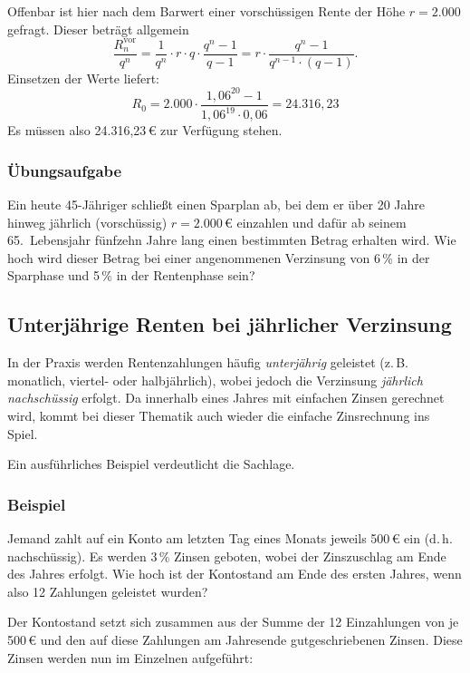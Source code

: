 Offenbar ist hier nach dem Barwert einer vorschüssigen Rente der Höhe $r = 2.000$ gefragt. Dieser beträgt allgemein
\[ \frac{R_n^{\text{vor}}}{q^n} = \frac{1}{q^n} \cdot r \cdot q \cdot \frac{q^n - 1}{q - 1} = r \cdot \frac{q^n - 1}{q^{n-1} \cdot (q - 1)} . \]
Einsetzen der Werte liefert:
\[ R_0 = 2.000 \cdot \frac{1{,}06^{20} - 1}{1{,}06^{19} \cdot 0{,}06} = 24.316{,}23 \]
Es müssen also 24.316{,}23\,€ zur Verfügung stehen.\beispielende

\subsubsection{Übungsaufgabe}

\begin{graukasten}
  Ein heute 45-Jähriger schließt einen Sparplan ab, bei dem er über 20 Jahre hinweg jährlich (vorschüssig) $r = 2.000\,€$ einzahlen und dafür ab seinem 65.~Lebensjahr fünfzehn Jahre lang einen bestimmten Betrag erhalten wird. Wie hoch wird dieser Betrag bei einer angenommenen Verzinsung von 6\,\% in der Sparphase und 5\,\% in der Rentenphase sein?
\end{graukasten}

\subsection{Unterjährige Renten bei jährlicher Verzinsung}

In der Praxis werden Rentenzahlungen häufig \emph{unterjährig} geleistet (z.\,B. monatlich, viertel- oder halbjährlich), wobei jedoch die Verzinsung \emph{jährlich nachschüssig} erfolgt. Da innerhalb eines Jahres mit einfachen Zinsen gerechnet wird, kommt bei dieser Thematik auch wieder die einfache Zinsrechnung ins Spiel.

Ein ausführliches Beispiel verdeutlicht die Sachlage.

\subsubsection{Beispiel}

Jemand zahlt auf ein Konto am letzten Tag eines Monats jeweils 500\,€ ein (d.\,h. nachschüssig). Es werden 3\,\% Zinsen geboten, wobei der Zinszuschlag am Ende des Jahres erfolgt. Wie hoch ist der Kontostand am Ende des ersten Jahres, wenn also 12 Zahlungen geleistet wurden?

Der Kontostand setzt sich zusammen aus der Summe der 12 Einzahlungen von je 500\,€ und den auf diese Zahlungen am Jahresende gutgeschriebenen Zinsen. Diese Zinsen werden nun im Einzelnen aufgeführt:

